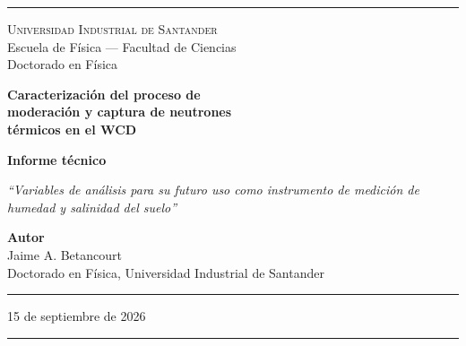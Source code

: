 \documentclass[11pt,a4paper]{article}
\begin{document}
\pagestyle{empty}


\begin{titlepage}
\begin{center}

\vspace*{0.5cm}
\textcolor{reglaColor}{\rule{\linewidth}{1.2pt}}

\vspace{1.3cm}
{\Large\scshape Universidad Industrial de Santander}\\[0.2cm]
{\large Escuela de Física --- Facultad de Ciencias}\\[0.2cm]
{\large Doctorado en Física}

\vspace{2.2cm}
{\Huge\bfseries\color{tituloColor} Caracterización del proceso de\\[0.2cm]
moderación y captura de neutrones\\[0.2cm] térmicos en el WCD}

\vspace{1.8cm}
{\large\textbf{Informe técnico}}

\vspace{0.6cm}
\begin{minipage}{0.82\linewidth}
\centering
\textit{``Variables de análisis para su futuro uso como instrumento de medición de humedad y
salinidad del suelo''}
\end{minipage}

\vfill

{\large\textbf{Autor}}\\[0.15cm]
Jaime A. Betancourt\\[0.1cm]
Doctorado en Física, Universidad Industrial de Santander

\vspace{1.2cm}
\textcolor{reglaColor}{\rule{0.5\linewidth}{0.6pt}}

\vspace{1cm}
15 de septiembre de 2026

\vspace{1cm}
\textcolor{reglaColor}{\rule{\linewidth}{1.2pt}}

\end{center}
\end{titlepage}

\pagestyle{plain}
\end{document}
